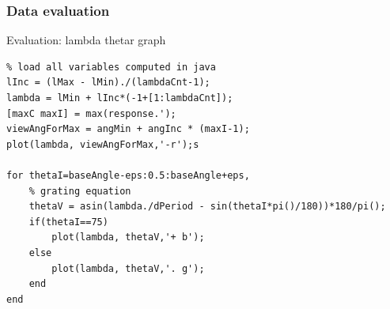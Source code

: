 \subsubsection{Data evaluation}

\begin{algorithm}
\caption{Evaluation: lambda thetar graph}
\begin{lstlisting}
% load all variables computed in java
lInc = (lMax - lMin)./(lambdaCnt-1);
lambda = lMin + lInc*(-1+[1:lambdaCnt]);
[maxC maxI] = max(response.');
viewAngForMax = angMin + angInc * (maxI-1);
plot(lambda, viewAngForMax,'-r');s

for thetaI=baseAngle-eps:0.5:baseAngle+eps,
	% grating equation
	thetaV = asin(lambda./dPeriod - sin(thetaI*pi()/180))*180/pi();
	if(thetaI==75)
		plot(lambda, thetaV,'+ b');
	else
		plot(lambda, thetaV,'. g');
	end
end

\end{lstlisting}
\end{algorithm}

